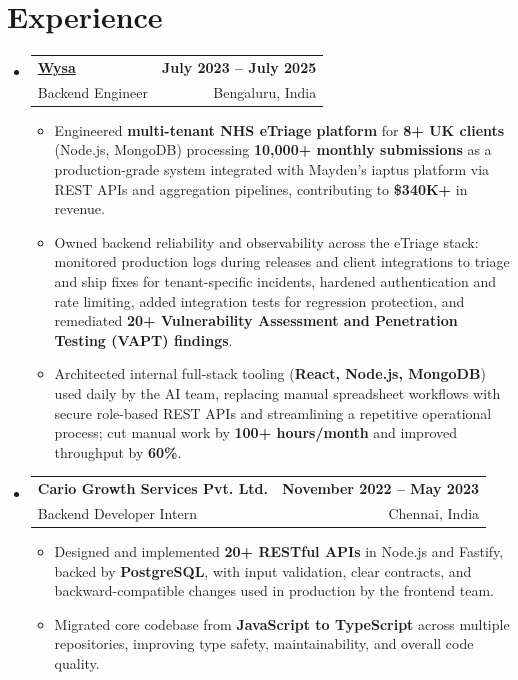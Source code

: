 \documentclass[letterpaper,10pt]{article}
\makeatletter
\newcommand{\resumeItem}[1]{
  \item\small{#1\vspace{-1pt}}
}
\newcommand{\resumeSubheading}[4]{
  \vspace{1pt}\item
    \begin{tabular*}{0.985\textwidth}[t]{l@{\extracolsep{\fill}}r}
      \textbf{#1} & \textbf{\small #2} \\
      {\small\color{ResumeSlate} #3} & {\small\color{ResumeSlate} #4} \\
    \end{tabular*}\vspace{-6pt}
}
\newcommand{\resumeSubHeadingListStart}{\begin{itemize}[leftmargin=0.0in, label={}, itemsep=2pt, topsep=2pt]}
\newcommand{\resumeSubHeadingListEnd}{\end{itemize}}
\newcommand{\resumeItemListStart}{\begin{itemize}[leftmargin=0.18in, itemsep=2pt, topsep=1pt]}
\newcommand{\resumeItemListEnd}{\end{itemize}\vspace{-4pt}}
\makeatother
\begin{document}
\section{Experience}
\resumeSubHeadingListStart
  \resumeSubheading
    {\href{https://www.wysa.io}{Wysa}}{July 2023 -- July 2025}
    {Backend Engineer}{Bengaluru, India}
    \resumeItemListStart
      \resumeItem{Engineered \textbf{multi-tenant NHS eTriage platform} for \textbf{8+ UK clients} (Node.js, MongoDB) processing \textbf{10{,}000+ monthly submissions} as a production-grade system integrated with Mayden's iaptus platform via REST APIs and aggregation pipelines, contributing to \textbf{\$340K+} in revenue.}
      \resumeItem{Owned backend reliability and observability across the eTriage stack: monitored production logs during releases and client integrations to triage and ship fixes for tenant-specific incidents, hardened authentication and rate limiting, added integration tests for regression protection, and remediated \textbf{20+ Vulnerability Assessment and Penetration Testing (VAPT) findings}.}
      \resumeItem{Architected internal full-stack tooling (\textbf{React, Node.js, MongoDB}) used daily by the AI team, replacing manual spreadsheet workflows with secure role-based REST APIs and streamlining a repetitive operational process; cut manual work by \textbf{100+ hours/month} and improved throughput by \textbf{60\%}.}
    \resumeItemListEnd
  \resumeSubheading
    {Cario Growth Services Pvt. Ltd.}{November 2022 -- May 2023}
    {Backend Developer Intern}{Chennai, India}
    \resumeItemListStart
      \resumeItem{Designed and implemented \textbf{20+ RESTful APIs} in Node.js and Fastify, backed by \textbf{PostgreSQL}, with input validation, clear contracts, and backward-compatible changes used in production by the frontend team.}
      \resumeItem{Migrated core codebase from \textbf{JavaScript to TypeScript} across multiple repositories, improving type safety, maintainability, and overall code quality.}
    \resumeItemListEnd
\resumeSubHeadingListEnd
\vspace{-4pt}
\end{document}
